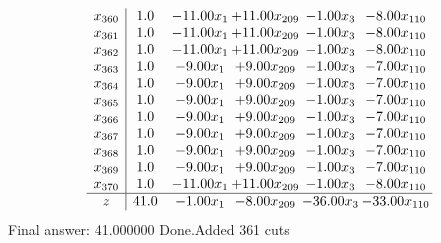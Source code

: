 \documentclass[8pt]{article}
\begin{document}
\[\begin{array}{c| c c@{\hskip 2pt} c@{\hskip 2pt} c@{\hskip 2pt} c@{\hskip 2pt} }
 x_{360}   &  1.0 & -11.00 x_{1} & + 11.00 x_{209} & -1.00 x_{3} & -8.00 x_{110}\\
 x_{361}   &  1.0 & -11.00 x_{1} & + 11.00 x_{209} & -1.00 x_{3} & -8.00 x_{110}\\
 x_{362}   &  1.0 & -11.00 x_{1} & + 11.00 x_{209} & -1.00 x_{3} & -8.00 x_{110}\\
 x_{363}   &  1.0 & -9.00 x_{1} & +  9.00 x_{209} & -1.00 x_{3} & -7.00 x_{110}\\
 x_{364}   &  1.0 & -9.00 x_{1} & +  9.00 x_{209} & -1.00 x_{3} & -7.00 x_{110}\\
 x_{365}   &  1.0 & -9.00 x_{1} & +  9.00 x_{209} & -1.00 x_{3} & -7.00 x_{110}\\
 x_{366}   &  1.0 & -9.00 x_{1} & +  9.00 x_{209} & -1.00 x_{3} & -7.00 x_{110}\\
 x_{367}   &  1.0 & -9.00 x_{1} & +  9.00 x_{209} & -1.00 x_{3} & -7.00 x_{110}\\
 x_{368}   &  1.0 & -9.00 x_{1} & +  9.00 x_{209} & -1.00 x_{3} & -7.00 x_{110}\\
 x_{369}   &  1.0 & -9.00 x_{1} & +  9.00 x_{209} & -1.00 x_{3} & -7.00 x_{110}\\
 x_{370}   &  1.0 & -11.00 x_{1} & + 11.00 x_{209} & -1.00 x_{3} & -8.00 x_{110}\\
\hline
z    &  41.0 & -1.00 x_{1} & -8.00 x_{209} & -36.00 x_{3} & -33.00 x_{110}\\
\end{array}\]
 Final answer: 41.000000 
Done.Added 361 cuts 
\end{document}
